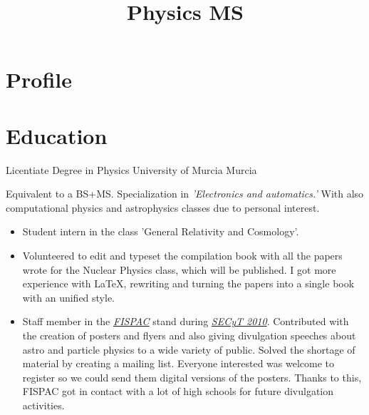 \documentclass[11pt,a4paper,roman]{moderncv}
\title{Physics MS}
\begin{document}
\maketitle



\section{Profile}

\section{Education}

	{Licentiate Degree in Physics}
	{University of Murcia}
	{Murcia}
	{}
	{Equivalent to a BS+MS. Specialization in \textit{'Electronics and automatics.'}
	 With also computational physics and astrophysics classes due to personal interest.
	\begin{itemize}
		\item Student intern in the class 'General Relativity and Cosmology'.
		\item Volunteered to edit and typeset the compilation book with all the 
		papers wrote for the Nuclear Physics class, which will be published. I got 
		more experience with \LaTeX, rewriting and turning the 
		papers into a single book with an unified style.
		\item Staff member in the \textit{\href{http://www.um.es/fispac/}
		{FISPAC}} stand during \textit{\href{http://www.f-
		seneca.org/secyt10/home.php}{SECyT 2010}}. Contributed with the creation of 
		posters and flyers and also giving divulgation speeches about astro and 
		particle physics to a wide variety of public. Solved the shortage of material 
		by creating a mailing list. Everyone interested was welcome to register so we 
		could send them digital versions of the posters. Thanks to this, FISPAC got 
		in contact with a lot of high schools for future divulgation activities.
	\end{itemize}	
	}
\end{document}
